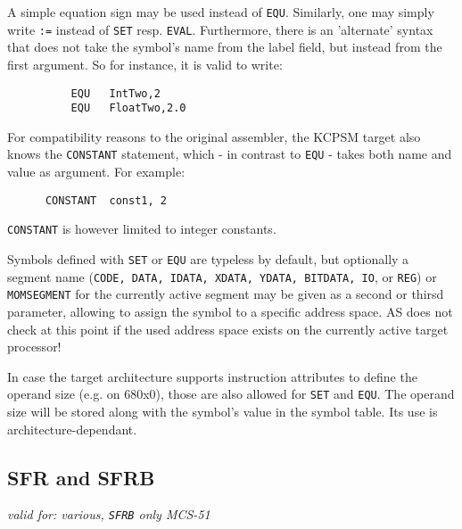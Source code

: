 \documentclass[12pt,twoside]{report}
\makeatletter
\newcommand{\tty}[1]{{\tt #1}}
\newcommand{\ttindex}[1]{\index{#1@{\tt #1}}}
\makeatother
\begin{document}
A simple equation sign may be used instead of \tty{EQU}.  Similarly, one
may simply write \tty{:=} instead of \tty{SET} resp. \tty{EVAL}.
Furthermore, there is an 'alternate' syntax that does not take
the symbol's name from the label field, but instead from the
first argument.  So for instance, it is valid to write:
\begin{verbatim}
          EQU   IntTwo,2
          EQU   FloatTwo,2.0
\end{verbatim}

For compatibility reasons to the original assembler, the KCPSM target also
knows the {\tt CONSTANT} statement, which - in contrast to \tty{EQU} -
takes both name and value as argument.  For example:
\begin{verbatim}
      CONSTANT  const1, 2
\end{verbatim}
{\tt CONSTANT} is however limited to integer constants.

Symbols defined with \tty{SET} or \tty{EQU} are typeless by default, but
optionally a segment name (\tty{CODE, DATA, IDATA, XDATA, YDATA, BITDATA,
IO}, or \tty{REG}) or \tty{MOMSEGMENT} for the currently active segment
may be given as a second or thirsd parameter, allowing to assign the symbol to a
specific address space.  AS does not check at this point if the used
address space exists on the currently active target processor!

In case the target architecture supports instruction attributes to define
the operand size (e.g. on 680x0), those are also allowed for \tty{SET} and
\tty{EQU}.  The operand size will be stored along with the symbol's value in
the symbol table.  Its use is architecture-dependant.


\subsection{SFR and SFRB}
\ttindex{SFR}\ttindex{SFRB}

{\em valid for: various, \tty{SFRB} only MCS-51}
\end{document}
